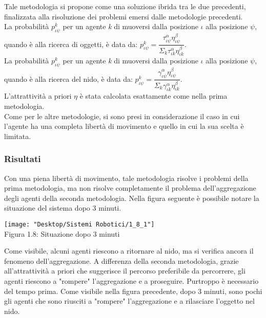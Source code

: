 \documentclass[12pt,a4paper,openright,twoside]{report}
\begin{document}
Tale metodologia si propone come una soluzione ibrida tra le due precedenti, finalizzata alla risoluzione dei problemi emersi dalle metodologie precedenti.\\
La probabilità $p^k_{\iota\psi}$ per un agente \textit{k} di muoversi dalla posizione $\iota$ alla posizione $\psi$, quando è alla ricerca di oggetti, è data da: $p^k_{\iota\psi}= \dfrac{\tau^\alpha_{\iota\psi}\eta^\beta_{\iota\psi}}{\Sigma_k\tau^\alpha_{\iota k}\eta^\beta_{\iota k}}$. \\
La probabilità $p^k_{\iota\psi}$ per un agente \textit{k} di muoversi dalla posizione $\iota$ alla posizione $\psi$, quando è alla ricerca del nido, è data da: $p^k_{\iota\psi}= \dfrac{\gamma^\alpha_{\iota\psi}\eta^\beta_{\iota\psi}}{\Sigma_k\gamma^\alpha_{\iota k}\eta^\beta_{\iota k}}$. \\
L'attrattività a priori $\eta$ è stata calcolata esattamente come nella prima metodologia.\\
Come per le altre metodologie, si sono presi in considerazione il caso in cui l'agente ha una completa libertà di movimento e quello in cui la sua scelta è limitata.\\

\subsubsection{Risultati}

Con una piena libertà di movimento, tale metodologia risolve i problemi della prima metodologia, ma non risolve completamente il problema dell'aggregazione degli agenti della seconda metodologia. Nella figura seguente è possibile notare la situazione del sistema dopo 3 minuti.\\

\begin{center}  
	\texttt{[image: "Desktop/Sistemi Robotici/1\_8\_1"]}
	\\Figura 1.8: Situazione dopo 3 minuti
\end{center}

Come visibile, alcuni agenti riescono a ritornare al nido, ma si verifica ancora il fenomeno dell'aggregazione. A differenza della seconda metodologia, grazie all'attrattività a priori che suggerisce il percorso preferibile da percorrere, gli agenti riescono a "rompere" l'aggregazione e a proseguire. Purtroppo è necessario del tempo prima. Come visibile nella figura precedente, dopo 3 minuti, sono pochi gli agenti che sono riusciti a "rompere" l'aggregazione e a rilasciare l'oggetto nel nido.\\
\end{document}
